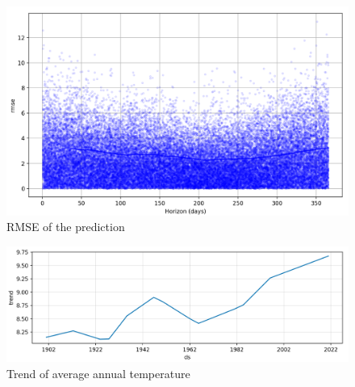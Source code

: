 \documentclass{article}
\begin{document}
\begin{figure}[h]
\centering
\includegraphics[width=12cm]{rmse.png} %
\caption{RMSE of the prediction} %
\end{figure}

\begin{figure}[h]
\centering
\includegraphics[width=15cm]{trend.png} %
\caption{Trend of average annual temperature} %
\end{figure}
\end{document}
